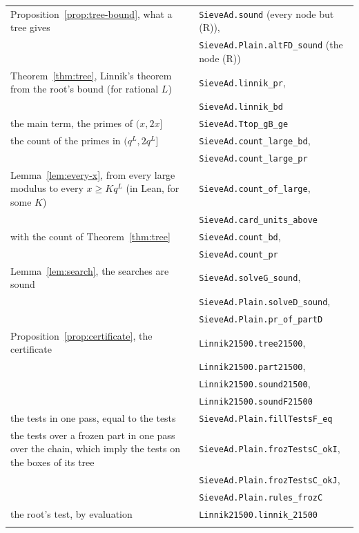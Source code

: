 \documentclass[11pt]{article}
\theoremstyle{definition}
\newcommand{\lean}[1]{\texttt{#1}}
\begin{document}
{\begin{longtable}{@{}>{\raggedright\arraybackslash}p{}l@{}}
Proposition~\ref{prop:tree-bound}, what a tree gives & \lean{SieveAd.sound} (every node but (R)), \\
 & \lean{SieveAd.Plain.altFD\_sound} (the node (R)) \\
Theorem~\ref{thm:tree}, Linnik's theorem from the root's bound (for rational $L$) & \lean{SieveAd.linnik\_pr}, \\
 & \lean{SieveAd.linnik\_bd} \\
\quad the main term, the primes of $(x, 2x]$ & \lean{SieveAd.Ttop\_gB\_ge} \\
\quad the count of the primes in $(q^L, 2q^L]$ & \lean{SieveAd.count\_large\_bd}, \\
 & \lean{SieveAd.count\_large\_pr} \\
Lemma~\ref{lem:every-x}, from every large modulus to every $x \ge Kq^L$ (in Lean, for some $K$) &
\lean{SieveAd.count\_of\_large}, \\
 & \lean{SieveAd.card\_units\_above} \\
\quad with the count of Theorem~\ref{thm:tree} & \lean{SieveAd.count\_bd}, \\
 & \lean{SieveAd.count\_pr} \\
Lemma~\ref{lem:search}, the searches are sound & \lean{SieveAd.solveG\_sound}, \\
 & \lean{SieveAd.Plain.solveD\_sound}, \\
 & \lean{SieveAd.Plain.pr\_of\_partD} \\
Proposition~\ref{prop:certificate}, the certificate & \lean{Linnik21500.tree21500}, \\
 & \lean{Linnik21500.part21500}, \\
 & \lean{Linnik21500.sound21500}, \\
 & \lean{Linnik21500.soundF21500} \\
\quad the tests in one pass, equal to the tests & \lean{SieveAd.Plain.fillTestsF\_eq} \\
\quad the tests over a frozen part in one pass over the chain, which imply the tests on the boxes of its tree &
\lean{SieveAd.Plain.frozTestsC\_okI}, \\
 & \lean{SieveAd.Plain.frozTestsC\_okJ}, \\
 & \lean{SieveAd.Plain.rules\_frozC} \\
\quad the root's test, by evaluation & \lean{Linnik21500.linnik\_21500} \\
\midrule
\multicolumn{2}{@{}l}{\emph{Theorem~\ref{thm:2110} and Sections~\ref{sec:window} to~\ref{sec:certificate-b}}} \\

\end{longtable}}
\end{document}

